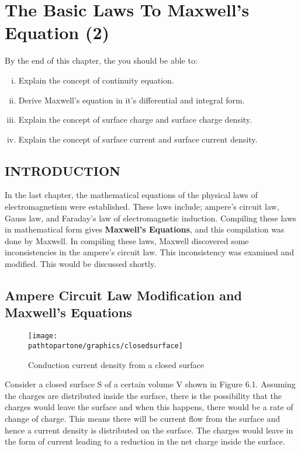 \chapter{The Basic Laws To Maxwell's Equation (2)}\label{lec:lec19}


\begin{mdframed}[backgroundcolor=lightblue, linewidth=1pt, hidealllines=true]
By the end of this chapter, the you should be able to:
\begin{enumerate}[(i)]
\item Explain the concept of continuity equation.

\item Derive Maxwell's equation in it's differential and integral form.

\item Explain the concept of surface charge and surface charge density. 

\item Explain the concept of surface current and surface current density.
\end{enumerate}
\end{mdframed}

\section{INTRODUCTION}
In the last chapter, the mathematical equations of the physical laws of electromagnetism were established. These laws include; ampere's circuit law, Gauss law, and Faraday's law of electromagnetic induction. Compiling these laws in mathematical form gives \textbf{Maxwell's Equations}, and this compilation was done by Maxwell. In compiling these laws, Maxwell discovered some inconsistencies in the ampere's circuit law. This inconsistency was examined and modified. This would be discussed shortly.

\section{Ampere Circuit Law Modification and Maxwell's Equations}
\begin{figure}[h]
\centering
\texttt{[image: \\pathtopartone/graphics/closedsurface]}
\caption{Conduction current density from a closed surface}
\end{figure}

Consider a closed surface S of a certain volume V shown in Figure 6.1. Assuming the charges are distributed inside the surface, there is the possibility that the charges would leave the surface and when this happens, there would be a rate of change of charge. This means there will be current flow from the surface and hence a current density is distributed on the surface. The charges would leave in the form of current leading to a reduction in the net charge inside the surface.

